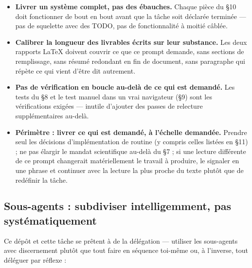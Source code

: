 \documentclass[11pt,a4paper]{article}
\begin{document}
\begin{itemize}
\item \textbf{Livrer un système complet, pas des ébauches.} Chaque pièce
  du \S10 doit fonctionner de bout en bout avant que la tâche soit
  déclarée terminée --- pas de squelette avec des TODO, pas de
  fonctionnalité à moitié câblée.
\item \textbf{Calibrer la longueur des livrables écrits sur leur
  substance.} Les deux rapports \LaTeX{} doivent couvrir ce que ce
  prompt demande, sans sections de remplissage, sans résumé redondant en
  fin de document, sans paragraphe qui répète ce qui vient d'être dit
  autrement.
\item \textbf{Pas de vérification en boucle au-delà de ce qui est
  demandé.} Les tests du \S8 et le test manuel dans un vrai navigateur
  (\S9) sont les vérifications exigées --- inutile d'ajouter des passes
  de relecture supplémentaires au-delà.
\item \textbf{Périmètre : livrer ce qui est demandé, à l'échelle
  demandée.} Prendre seul les décisions d'implémentation de routine (y
  compris celles listées en \S11) ; ne pas élargir le mandat
  scientifique au-delà du \S7 ; si une lecture différente de ce prompt
  changerait matériellement le travail à produire, le signaler en une
  phrase et continuer avec la lecture la plus proche du texte plutôt que
  de redéfinir la tâche.
\end{itemize}

\subsection*{Sous-agents : subdiviser intelligemment, pas systématiquement}

Ce dépôt et cette tâche se prêtent à de la délégation --- utiliser les
sous-agents avec discernement plutôt que tout faire en séquence toi-même
ou, à l'inverse, tout déléguer par réflexe :
\end{document}
